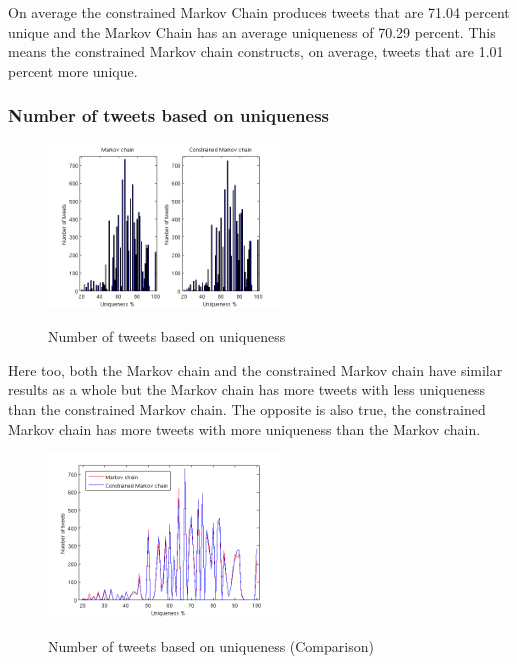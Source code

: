 \documentclass[a4paper,12pt]{article}
\begin{document}
 On average the constrained Markov Chain produces tweets that are 71.04 percent unique and the Markov Chain has an average uniqueness of 70.29 percent. This means the constrained Markov chain constructs, on average, tweets that are 1.01 percent more unique.


\subsubsection{Number of tweets based on uniqueness}

\begin{figure}[h!]
  \hfill
  {\includegraphics[width=1\linewidth, height = 165]{NumTweetsByUniq.png}}
  \caption{Number of tweets based on uniqueness}
 \end{figure}
 
 Here too, both the Markov chain and the constrained Markov chain have similar results as a whole but the Markov chain has more tweets with less uniqueness than the constrained Markov chain. The opposite is also true, the constrained Markov chain has more tweets with more uniqueness than the Markov chain.
 
  \begin{figure}[h!]
   \hfill
  {\includegraphics[width=1\linewidth, height = 165]{NumTweetsByUniq2.png}}
  \hfill
  \caption{Number of tweets based on uniqueness (Comparison)}
 \end{figure}
\end{document}
